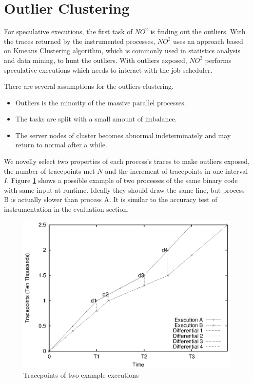\section{Outlier Clustering}

For speculative executions, the first task of $NO^2$ is finding out the outliers.
With the traces returned by the instrumented processes, $NO^2$ uses an approach based on
Kmeans Clustering algorithm, which is commonly used in statistics analysis and data
mining, to hunt the outliers. With outliers exposed, $NO^2$ performs speculative
executions which needs to interact with the job scheduler.

There are several assumptions for the outliers clustering.

\begin{itemize}
\item Outliers is the minority of the massive parallel processes.
\item The tasks are split with a small amount of imbalance.
\item The server nodes of cluster becomes abnormal indeterminately and may return to
normal after a while.
\end{itemize}

We novelly select two properties of each process's traces to make outliers exposed, the
number of tracepoints met $N$ and the increment of tracepoints in one interval
$I$. Figure \ref{figure:executionsexample} shows a possible example of two processes of
the same binary code with same input at runtime. Ideally they should draw the same line,
but process B is actually slower than process A. It is similar to the accuracy test of
instrumentation in the evaluation section.

\begin{figure}
\centering
\includegraphics[width=0.9\columnwidth]{figures/executions_example.eps}
\caption{Tracepoints of two example executions}
\label{figure:executionsexample}
\end{figure}

